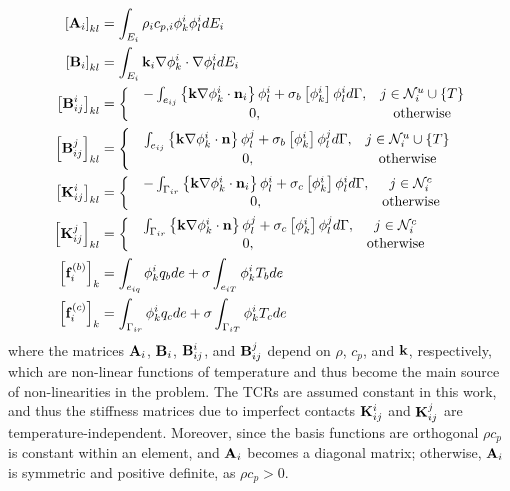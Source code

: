 \begin{subequations}
    \begin{align}
        \left[\mathbf{A}_i\right]_{kl} &= \int_{E_i}\rho_i c_{p,i}\phi_k^i\phi_l^i dE_i\\
        \left[\mathbf{B}_i\right]_{kl} &= \int_{E_i}\mathbf{k}_i\nabla\phi_k^i\cdot\nabla\phi_l^i dE_i\\
        \left[\mathbf{B}_{ij}^{i}\right]_{kl} &= \left\{\begin{matrix}
            &-\int_{e_{ij}}\left\{\mathbf{k}\nabla\phi_k^i\cdot\mathbf{n}_i\right\}\phi_l^i + \sigma_b\left[\phi_k^i\right]\phi_l^id\Gamma, & j\in\mathcal{N}_i^{u}\cup\left\{T\right\}\\
            &0, & \text{otherwise}
        \end{matrix}\right.\\
        \left[\mathbf{B}_{ij}^{j}\right]_{kl} &= \left\{\begin{matrix}
            &\int_{e_{ij}}\left\{\mathbf{k}\nabla\phi_k^i\cdot\mathbf{n}\right\}\phi_l^j + \sigma_b\left[\phi_k^i\right]\phi_l^jd\Gamma, & j\in\mathcal{N}_i^{u}\cup\left\{T\right\}\\
            &0, & \text{otherwise}
        \end{matrix}\right.\\
        \left[\mathbf{K}_{ij}^{i}\right]_{kl} &= \left\{\begin{matrix}
            &-\int_{\Gamma_{ir}}\left\{\mathbf{k}\nabla\phi_k^i\cdot\mathbf{n}_i\right\}\phi_l^i + \sigma_c\left[\phi_k^i\right]\phi_l^id\Gamma, & j\in\mathcal{N}_{i}^{c}\\
            &0, & \text{otherwise}
        \end{matrix}\right.\\
        \left[\mathbf{K}_{ij}^{j}\right]_{kl} &= \left\{\begin{matrix}
            &\int_{\Gamma_{ir}}\left\{\mathbf{k}\nabla\phi_k^i\cdot\mathbf{n}\right\}\phi_l^j + \sigma_c\left[\phi_k^i\right]\phi_l^jd\Gamma, & j\in\mathcal{N}_{i}^{c}\\
            &0, & \text{otherwise}
        \end{matrix}\right.\\
        \left[\mathbf{f}_i^{(b)}\right]_{k} &= \int_{e_{iq}}\phi_k^iq_b de + \sigma\int_{e_{iT}}\phi_k^iT_b de\\
        \left[\mathbf{f}_i^{(c)}\right]_{k} &= \int_{\Gamma_{ir}}\phi_k^iq_c de + \sigma\int_{\Gamma_{iT}}\phi_k^iT_c de
    \end{align}\label{eqn_dgfem_matrix_elements}
\end{subequations}
where the matrices $\mathbf{A}_i$, $\mathbf{B}_i$, $\mathbf{B}_{ij}^i$, and $\mathbf{B}_{ij}^j$ depend on $\rho$, $c_p$, and $\mathbf{k}$, respectively, which are non-linear functions of temperature and thus become the main source of non-linearities in the problem. The TCRs are assumed constant in this work, and thus the stiffness matrices due to imperfect contacts $\mathbf{K}_{ij}^{i}$ and $\mathbf{K}_{ij}^{j}$ are temperature-independent. Moreover, since the basis functions are orthogonal $\rho c_p$ is constant within an element, and $\mathbf{A}_i$ becomes a diagonal matrix; otherwise, $\mathbf{A}_i$ is symmetric and positive definite, as $\rho c_p > 0$.

